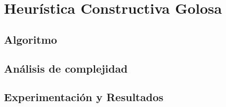 \section{Heurística Constructiva Golosa}

\subsection{Algoritmo}

\subsection{Análisis de complejidad}

\subsection{Experimentación y Resultados}
